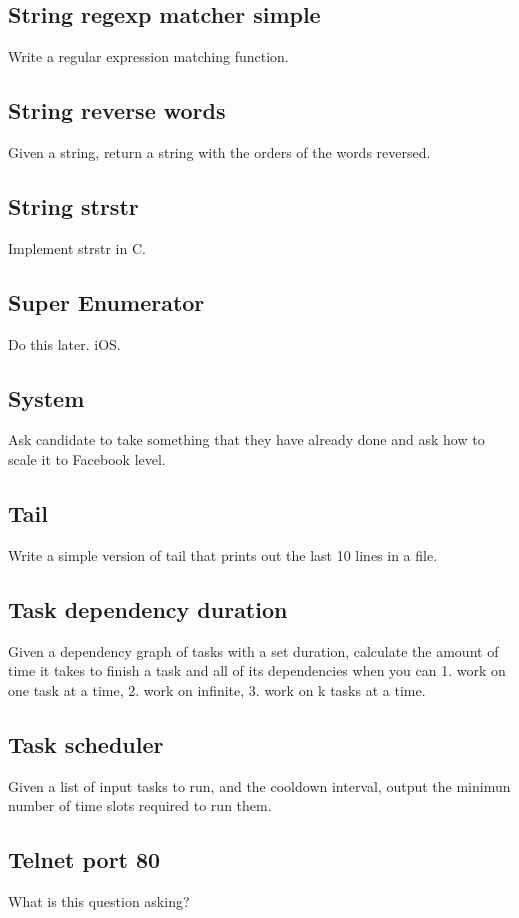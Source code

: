 \documentclass{llncs}
\begin{document}
\subsection{String regexp matcher simple}
Write a regular expression matching function.

\subsection{String reverse words}
Given a string, return a string with the orders of the words reversed.

\subsection{String strstr}
Implement strstr in C.

\subsection{Super Enumerator}
Do this later. iOS.

\subsection{System}
Ask candidate to take something that they have already done and ask how to scale it to Facebook level.

\subsection{Tail}
Write a simple version of tail that prints out the last 10 lines in a file.

\subsection{Task dependency duration}
Given a dependency graph of tasks with a set duration, calculate the amount of time it takes to finish a task and all of its dependencies when you can 1. work on one task at a time, 2. work on infinite, 3. work on k tasks at a time.

\subsection{Task scheduler}
Given a list of input tasks to run, and the cooldown interval, output the minimun number of time slots required to run them.

\subsection{Telnet port 80}
What is this question asking?
\end{document}
